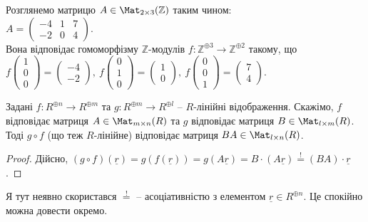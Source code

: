 \documentclass{math_library}
\begin{document}
\begin{example}
Розглянемо матрицю $A \in \Mat_{2 \times 3}(\mathbb{Z})$ таким чином: \\ $A = \begin{pmatrix}
-4 & 1 & 7 \\
-2 & 0 & 4
\end{pmatrix}$. \\
Вона відповідає гомоморфізму $\mathbb{Z}$-модулів $f \colon \mathbb{Z}^{\oplus 3} \to \mathbb{Z}^{\oplus 2}$ такому, що\\
$f\begin{pmatrix}
1 \\ 0 \\ 0
\end{pmatrix} = \begin{pmatrix}
-4 \\ -2
\end{pmatrix},\ f\begin{pmatrix}
0 \\ 1 \\ 0
\end{pmatrix} = \begin{pmatrix}
1 \\ 0
\end{pmatrix},\ f\begin{pmatrix}
0 \\ 0 \\ 1
\end{pmatrix} = \begin{pmatrix}
7 \\ 4
\end{pmatrix}$.
\end{example}

\begin{proposition}
Задані $f \colon R^{\oplus n} \to R^{\oplus m}$ та $g \colon R^{\oplus m} \to R^{\oplus l}$ -- $R$-лінійні відображення. Скажімо, $f$ відповідає матриця $A \in \Mat_{m \times n}(R)$ та $g$ відповідає матриця $B \in \Mat_{l \times m}(R)$. Тоді $g \circ f$ (що теж $R$-лінійне) відповідає матриця $B A \in \Mat_{l \times n}(R)$.
\end{proposition}

\begin{proof}
Дійсно, $(g \circ f)(\underline{r}) = g(f(\underline{r})) = g(A \underline{r}) = B \cdot (A \underline{r}) \overset{!}{=} (BA) \cdot \underline{r}$.
\end{proof}

\begin{remark}
Я тут неявно скористався $\overset{!}{=}$ -- асоціативністю з елементом $\underline{r} \in R^{\oplus n}$. Це спокійно можна довести окремо.
\end{remark}
\end{document}
